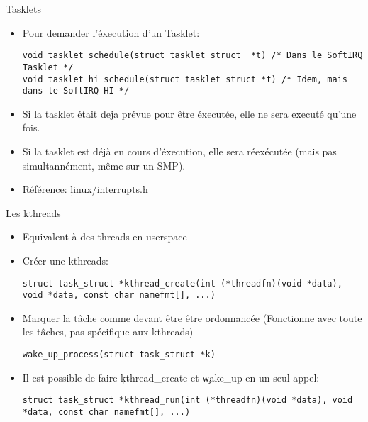 \begin{frame}[fragile=singleslide]{Tasklets}
  \begin{itemize} 
  \item Pour demander l'éxecution d'un Tasklet:
    \begin{lstlisting} 
void tasklet_schedule(struct tasklet_struct  *t) /* Dans le SoftIRQ Tasklet */
void tasklet_hi_schedule(struct tasklet_struct *t) /* Idem, mais dans le SoftIRQ HI */
    \end{lstlisting} 
  \item Si  la tasklet était deja  prévue pour être  éxecutée, elle ne
    sera executé qu'une fois.
  \item  Si  la tasklet  est  déjà  en  cours d'éxecution,  elle  sera
    réexécutée (mais pas simultannément, même sur un SMP).
  \item Référence: \c{linux/interrupts.h}
  \end{itemize}
\end{frame} 

\begin{frame}[fragile=singleslide]{Les kthreads}
  \begin{itemize}
  \item Equivalent à des threads en userspace
  \item Créer une kthreads:
    \begin{lstlisting} 
struct task_struct *kthread_create(int (*threadfn)(void *data), void *data, const char namefmt[], ...)
    \end{lstlisting} 
  \item  Marquer   la  tâche   comme  devant  être   être  ordonnancée
    (Fonctionne avec toute les tâches, pas spécifique aux kthreads)
    \begin{lstlisting} 
wake_up_process(struct task_struct *k)
    \end{lstlisting} 
  \item Il est possible de faire \c{kthread_create} et \c{wake_up} en
    un seul appel:
    \begin{lstlisting} 
struct task_struct *kthread_run(int (*threadfn)(void *data), void *data, const char namefmt[], ...)
    \end{lstlisting}
  \end{itemize}
\end{frame}

